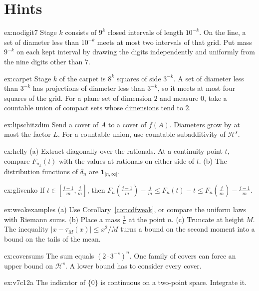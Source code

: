 \section{Hints}

\begin{hint}{ex:nodigit7}
Stage $k$ consists of $9^k$ closed intervals of length $10^{-k}$. On the line, a set of diameter less than $10^{-k}$ meets at most two
intervals of that grid. Put mass $9^{-k}$ on each kept interval by drawing the digits independently and uniformly from the nine digits other
than $7$.
\end{hint}
\begin{hint}{ex:carpet}
Stage $k$ of the carpet is $8^k$ squares of side $3^{-k}$. A set of diameter less than $3^{-k}$ has projections of diameter less than
$3^{-k}$, so it meets at most four squares of the grid. For a plane set of dimension $2$ and measure $0$, take a countable union of compact
sets whose dimensions tend to $2$.
\end{hint}
\begin{hint}{ex:lipschitzdim}
Send a cover of $A$ to a cover of $f(A)$. Diameters grow by at most the factor $L$. For a countable union, use countable subadditivity of
$\mathcal H^s$.
\end{hint}
\begin{hint}{ex:helly}
(a) Extract diagonally over the rationals. At a continuity point $t$, compare $F_{n_k}(t)$ with the values at rationals on either side of
$t$. (b) The distribution functions of $\delta_n$ are $\mathbf 1_{[n,\infty[}$.
\end{hint}
\begin{hint}{ex:glivenko}
If $t\in[\frac{j-1}m,\frac jm]$, then $F_n(\frac{j-1}m)-\frac jm\le F_n(t)-t\le F_n(\frac jm)-\frac{j-1}m$.
\end{hint}
\begin{hint}{ex:weakexamples}
(a) Use Corollary~\ref{cor:cdfweak}, or compare the uniform laws with Riemann sums. (b) Place a mass $\frac1n$ at the point $n$. (c) Truncate at
height $M$. The inequality $|x-\tau_M(x)|\le x^2/M$ turns a bound on the second moment into a bound on the tails of the mean.
\end{hint}
\begin{hint}{ex:coversums}
The sum equals $(2\cdot 3^{-s})^n$. One family of covers can force an upper bound on $\mathcal H^s$. A lower bound has to consider every
cover.
\end{hint}
\begin{hint}{ex:v7c12a}
The indicator of $\{0\}$ is continuous on a two-point space. Integrate it.
\end{hint}
